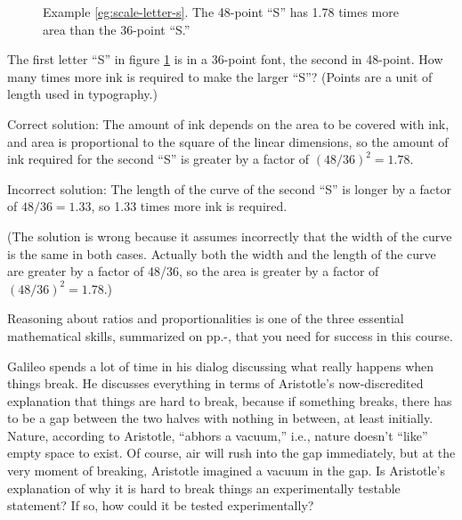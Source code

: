 \begin{figure}[h] 
\begin{center}

\caption{ \qquad %
%
 Example \ref{eg:scale-letter-s}. The 48-point ``S'' has 1.78 times
 more area than the 36-point ``S.''
 }
\end{center}
\label{eg-scale-letter-s}
\end{figure}


\vspace{1.5mm}

\begin{exmp}
\label{eg:scale-letter-s}
 The first letter ``S'' in figure \ref{eg-scale-letter-s} is in a
36-point font, the second in 48-point. How many times more
ink is required to make the larger ``S''? (Points are a unit
of length used in typography.)

Correct solution: The amount of ink depends on the area to
be covered with ink, and area is proportional to the square
of the linear dimensions, so the amount of ink required for
the second ``S'' is greater by a factor of $(48/36)^2=1.78$.

Incorrect solution: The length of the curve of the second
``S'' is longer by a factor of $48/36=1.33$, so 1.33 times
more ink is required.

(The solution is wrong because it assumes incorrectly that
the width of the curve is the same in both cases. Actually
both the width and the length of the curve are greater by a
factor of 48/36, so the area is greater by a factor
of $(48/36)^2=1.78$.)
\end{exmp}
\divider
\vspace{2mm}

Reasoning about ratios and proportionalities
is one of the three essential mathematical skills, summarized on pp.\pageref{begin-skills}-\pageref{end-skills},
that you need for success in this course.


Galileo spends a lot of time in his dialog discussing
what really happens when things break. He discusses
everything in terms of Aristotle's now-discredited
explanation that things are hard to break, because if
something breaks, there has to be a gap between the two
halves with nothing in between, at least initially. Nature,
according to Aristotle, ``abhors a vacuum,'' i.e., nature
doesn't ``like'' empty space to exist. Of course, air will
rush into the gap immediately, but at the very moment of
breaking, Aristotle imagined a vacuum in the gap. Is
Aristotle's explanation of why it is hard to break things an
experimentally testable statement? If so, how could it be
tested experimentally?
\





